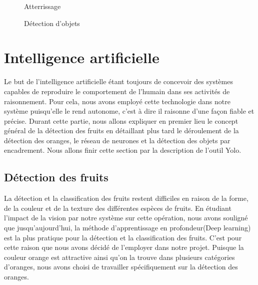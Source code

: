 \begin{figure}[H]
	\begin{minipage}{0.49\textwidth}
		\caption{Atterrissage }
	
	\end{minipage}
	\begin{minipage}{0.49\textwidth}
		\caption{Détection d'objets }
		
	\end{minipage}
\end{figure}
\section{Intelligence artificielle}
Le but de l'intelligence artificielle étant toujours de concevoir des systèmes capables de reproduire le comportement de l'humain dans ses activités de raisonnement\cite{PowerPoint}. Pour cela, nous avons employé cette technologie dans notre système puisqu'elle le rend autonome, c'est à dire il raisonne d'une façon fiable et précise. 
Durant cette partie, nous allons expliquer en premier lieu le concept général de la détection des fruits en détaillant plus tard le déroulement de la détection des oranges, le réseau de neurones et la détection des objets par encadrement. Nous allons finir cette section par la description de l'outil Yolo. 

\subsection{Détection des fruits}
La détection et la classification des fruits restent difficiles en raison de la forme, de la couleur et de la texture des différentes espèces de fruits. En étudiant l'impact de la vision par notre système sur cette opération, nous avons souligné que jusqu'aujourd'hui, la méthode d'apprentissage en profondeur(Deep learning) est la plus pratique pour la détection et la classification des fruits. C'est pour cette raison que nous avons décidé de l'employer dans notre projet. Puisque la couleur orange est attractive ainsi qu'on la trouve dans plusieurs catégories d'oranges, nous avons choisi de travailler spécifiquement sur la détection des oranges.
